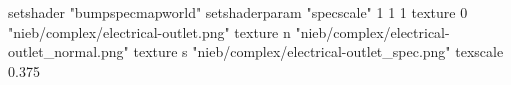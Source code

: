 setshader "bumpspecmapworld"
setshaderparam "specscale" 1 1 1
    texture 0 "nieb/complex/electrical-outlet.png"
    texture n "nieb/complex/electrical-outlet_normal.png"
    texture s "nieb/complex/electrical-outlet_spec.png"
    texscale 0.375